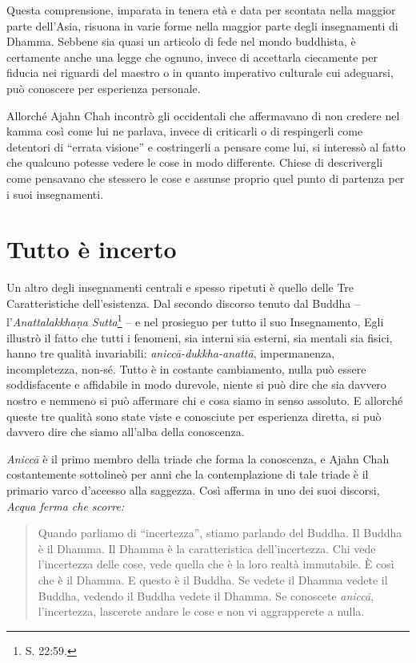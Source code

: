 Questa comprensione, imparata in tenera età e data per scontata nella
maggior parte dell'Asia, risuona in varie forme nella maggior parte
degli insegnamenti di Dhamma. Sebbene sia quasi un articolo di fede nel
mondo buddhista, è certamente anche una legge che ognuno, invece di
accettarla ciecamente per fiducia nei riguardi del maestro o in quanto
imperativo culturale cui adeguarsi, può conoscere per esperienza
personale.

Allorché Ajahn Chah incontrò gli occidentali che affermavano di non
credere nel kamma così come lui ne parlava, invece di criticarli
o di respingerli come detentori di ``errata visione'' e costringerli a
pensare come lui, si interessò al fatto che qualcuno potesse vedere le
cose in modo differente. Chiese di descrivergli come pensavano che
stessero le cose e assunse proprio quel punto di partenza per i suoi
insegnamenti.

\section{Tutto è incerto}

Un altro degli insegnamenti centrali e spesso ripetuti è quello delle
Tre Caratteristiche dell'esistenza. Dal secondo discorso tenuto dal
Buddha -- l'\emph{Anattalakkhaṇa Sutta}\footnote{S. 22:59.}
-- e nel prosieguo per tutto il suo Insegnamento, Egli
illustrò il fatto che tutti i fenomeni, sia interni sia esterni, sia
mentali sia fisici, hanno tre qualità invariabili:
\emph{aniccā-dukkha-anattā}, impermanenza, incompletezza, non-sé. Tutto
è in costante cambiamento, nulla può essere soddisfacente e affidabile
in modo durevole, niente si può dire che sia davvero nostro e nemmeno si
può affermare chi e cosa siamo in senso assoluto. E allorché queste tre
qualità sono state viste e conosciute per esperienza diretta, si può
davvero dire che siamo all'alba della conoscenza.

\emph{Aniccā} è il primo membro della triade che forma la conoscenza, e
Ajahn Chah costantemente sottolineò per anni che la contemplazione di
tale triade è il primario varco d'accesso alla saggezza. Così afferma in
uno dei suoi discorsi, \emph{Acqua ferma che scorre:}

\begin{quote}
Quando parliamo di ``incertezza'', stiamo parlando del Buddha. Il Buddha
è il Dhamma. Il Dhamma è la caratteristica dell'incertezza. Chi vede
l'incertezza delle cose, vede quella che è la loro realtà immutabile. È
così che è il Dhamma. E questo è il Buddha. Se vedete il Dhamma vedete
il Buddha, vedendo il Buddha vedete il Dhamma. Se conoscete
\emph{aniccā}, l'incertezza, lascerete andare le cose e non vi
aggrapperete a nulla.
\end{quote}

